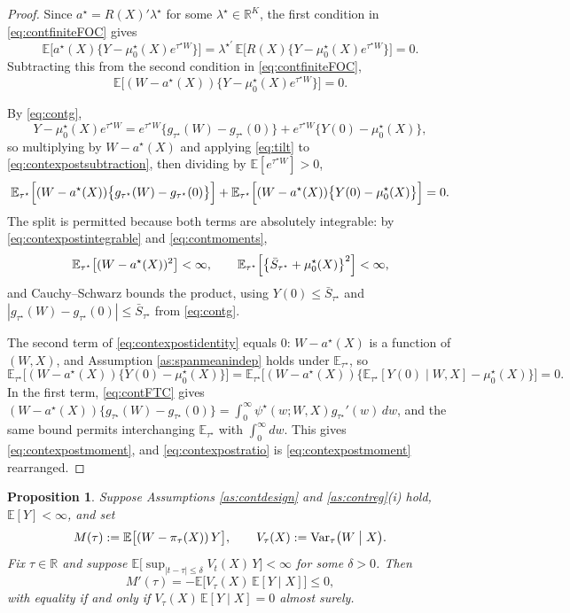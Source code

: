\documentclass[11pt]{article}
\newtheorem{proposition}[theorem]{Proposition}
\theoremstyle{definition}
\theoremstyle{plain}
\newcommand{\E}{\mathbb{E}}
\newcommand{\1}{\mathbf{1}}
\newcommand{\R}{\mathbb{R}}
\begin{document}
\begin{proof}
Since $a^\star=R(X)'\lambda^\star$ for some $\lambda^\star\in\R^K$, the first condition in \eqref{eq:contfiniteFOC} gives
\[
\E\Big[a^\star(X)\bigl\{Y-\mu_0^\star(X)e^{\tau^\star W}\bigr\}\Big]
=\lambda^{\star\prime}\,\E\Big[R(X)\bigl\{Y-\mu_0^\star(X)e^{\tau^\star W}\bigr\}\Big]=0 .
\]
Subtracting this from the second condition in \eqref{eq:contfiniteFOC},
\begin{equation}
\E\Big[(W-a^\star(X))\bigl\{Y-\mu_0^\star(X)e^{\tau^\star W}\bigr\}\Big]=0 .
\label{eq:contexpostsubtraction}
\end{equation}

By \eqref{eq:contg},
\[
Y-\mu_0^\star(X)e^{\tau^\star W}
=
e^{\tau^\star W}\bigl\{g_{\tau^\star}(W)-g_{\tau^\star}(0)\bigr\}+e^{\tau^\star W}\bigl\{Y(0)-\mu_0^\star(X)\bigr\},
\]
so multiplying by $W-a^\star(X)$ and applying \eqref{eq:tilt} to \eqref{eq:contexpostsubtraction}, then dividing by $\E[e^{\tau^\star W}]>0$,
\begin{equation}
\E_{\tau^\star}\Bigl[(W-a^\star(X))\bigl\{g_{\tau^\star}(W)-g_{\tau^\star}(0)\bigr\}\Bigr]
+\E_{\tau^\star}\Bigl[(W-a^\star(X))\bigl\{Y(0)-\mu_0^\star(X)\bigr\}\Bigr]=0 .
\label{eq:contexpostidentity}
\end{equation}
The split is permitted because both terms are absolutely integrable: by \eqref{eq:contexpostintegrable} and \eqref{eq:contmoments},
\[
\E_{\tau^\star}\bigl[(W-a^\star(X))^2\bigr]<\infty,
\qquad
\E_{\tau^\star}\Bigl[\bigl\{\bar S_{\tau^\star}+\mu_0^\star(X)\bigr\}^2\Bigr]<\infty ,
\]
and Cauchy--Schwarz bounds the product, using $Y(0)\le\bar S_{\tau^\star}$ and $|g_{\tau^\star}(W)-g_{\tau^\star}(0)|\le\bar S_{\tau^\star}$ from \eqref{eq:contg}.

The second term of \eqref{eq:contexpostidentity} equals 0: $W-a^\star(X)$ is a function of $(W,X)$, and Assumption \ref{as:spanmeanindep} holds under $\E_{\tau^\star}$, so
\[
\E_{\tau^\star}\bigl[(W-a^\star(X))\{Y(0)-\mu_0^\star(X)\}\bigr]
=\E_{\tau^\star}\bigl[(W-a^\star(X))\{\E_{\tau^\star}[Y(0)\mid W,X]-\mu_0^\star(X)\}\bigr]=0 .
\]
In the first term, \eqref{eq:contFTC} gives $(W-a^\star(X))\{g_{\tau^\star}(W)-g_{\tau^\star}(0)\}=\int_0^\infty \psi^\star(w;W,X)g_{\tau^\star}'(w)\,dw$, and the same bound permits interchanging $\E_{\tau^\star}$ with $\int_0^\infty dw$.  This gives \eqref{eq:contexpostmoment}, and \eqref{eq:contexpostratio} is \eqref{eq:contexpostmoment} rearranged.
\end{proof}

\begin{proposition}
\label{prop:contmonotone}
Suppose Assumptions \ref{as:contdesign} and \ref{as:contreg}(i) hold, $\E[Y]<\infty$, and set
\[
M(\tau):=\E\bigl[(W-\pi_\tau(X))\,Y\bigr],
\qquad
V_\tau(X):=\operatorname{Var}_\tau\bigl(W\bigm| X\bigr).
\]
Fix $\tau\in\R$ and suppose $\E\bigl[\sup_{|t-\tau|\le\delta}V_t(X)\,Y\bigr]<\infty$ for some $\delta>0$.  Then
\[
M'(\tau)=-\E\bigl[V_\tau(X)\,\E[Y\mid X]\bigr]\le 0 ,
\]
with equality if and only if $V_\tau(X)\,\E[Y\mid X]=0$ almost surely.
\end{proposition}
\end{document}
